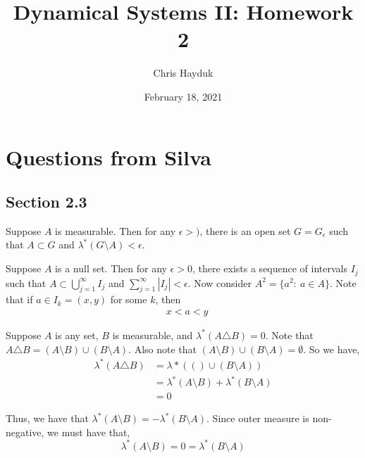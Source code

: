 \documentclass[12pt]{article}
\newenvironment{problem}[2][Problem]{\begin{trivlist}
\item[\hskip \labelsep {\bfseries #1}\hskip \labelsep {\bfseries #2.}]}{\end{trivlist}}
\begin{document}
\title{Dynamical Systems II: Homework 2}

\author{Chris Hayduk}
\date{February 18, 2021}

\maketitle

\section{Questions from Silva}

\subsection{Section 2.3}

\begin{problem}{1}
\end{problem}

Suppose $A$ is measurable. Then for any $\epsilon > )$, there is an open set $G = G_{\epsilon}$ such that $A \subset G$ and $\lambda^*(G \setminus A) < \epsilon$.

\begin{problem}{2}
\end{problem}

Suppose $A$ is a null set. Then for any $\epsilon > 0$, there exists a sequence of intervals $I_j$ such that $A \subset \bigcup_{j=1}^{\infty} I_j$ and $\sum_{j=1}^{\infty} | I_j | < \epsilon$. Now consider $A^2 = \{a^2 : \ a \in A\}$. Note that if $a \in I_k = (x, y)$ for some $k$, then
\begin{align*}
&x < a < y
\end{align*}

\begin{problem}{3}
\end{problem}

Suppose $A$ is any set, $B$ is measurable, and $\lambda^*(A \triangle B) = 0$. Note that $A \triangle B = (A \setminus B) \cup (B \setminus A)$. Also note that $(A \setminus B) \cup (B \setminus A) = \emptyset$. So we have,
\begin{align*}
\lambda^*(A \triangle B) &= \lambda*(() \cup (B \setminus A))\\
&= \lambda^*(A \setminus B) + \lambda^*(B \setminus A)\\
&= 0
\end{align*}

Thus, we have that $\lambda^*(A \setminus B) = -\lambda^*(B \setminus A)$. Since outer measure is non-negative, we must have that, $$\lambda^*(A \setminus B) = 0 = \lambda^*(B \setminus A)$$
\end{document}
